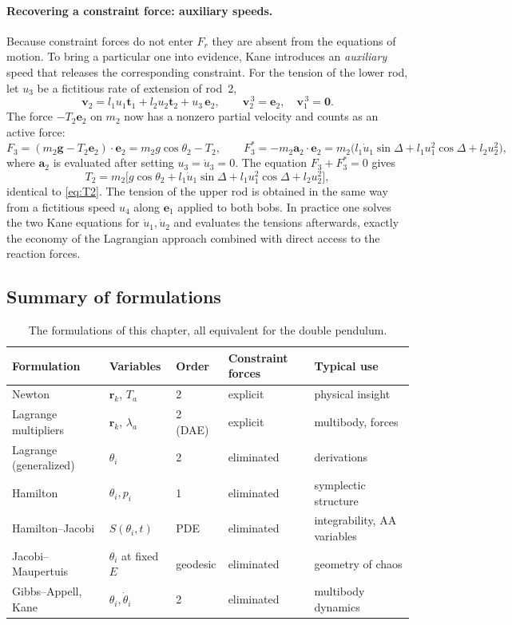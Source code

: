 \documentclass[11pt,a4paper]{book}
\theoremstyle{definition}
\theoremstyle{remark}
\begin{document}
\paragraph{Recovering a constraint force: auxiliary speeds.} Because constraint forces do not enter $F_r$ they are
absent from the equations of motion. To bring a particular one into evidence, Kane introduces an
\emph{auxiliary} speed that releases the corresponding constraint. For the tension of the lower rod, let $u_3$ be a
fictitious rate of extension of rod~2,
\[
  \bm v_2=l_1u_1\bm t_1+l_2u_2\bm t_2+u_3\,\bm e_2,\qquad \bm v_2^{\,3}=\bm e_2,\quad\bm v_1^{\,3}=\bm 0 .
\]
The force $-T_2\bm e_2$ on $m_2$ now has a nonzero partial velocity and counts as an active force:
\[
  F_3=(m_2\bm g-T_2\bm e_2)\cdot\bm e_2=m_2g\cos\theta_2-T_2,\qquad
  F_3^*=-m_2\bm a_2\!\cdot\!\bm e_2=m_2\big(l_1\dot u_1\sin\Delta+l_1u_1^2\cos\Delta+l_2u_2^2\big),
\]
where $\bm a_2$ is evaluated after setting $u_3=\dot u_3=0$. The equation $F_3+F_3^*=0$ gives
\[
  T_2=m_2\big[g\cos\theta_2+l_1\dot u_1\sin\Delta+l_1u_1^2\cos\Delta+l_2u_2^2\big],
\]
identical to \eqref{eq:T2}. The tension of the upper rod is obtained in the same way from a fictitious speed
$u_4$ along $\bm e_1$ applied to both bobs. In practice one solves the two Kane equations for $\dot u_1,\dot u_2$ and
evaluates the tensions afterwards, exactly the economy of the Lagrangian approach combined with direct access to
the reaction forces.

\subsection{Summary of formulations}

\begin{table}[ht]
\centering
\begin{tabular}{@{}lllll@{}}
\toprule
Formulation & Variables & Order & Constraint forces & Typical use\\
\midrule
Newton & $\bm r_k$, $T_a$ & 2 & explicit & physical insight\\
Lagrange multipliers & $\bm r_k$, $\lambda_a$ & 2 (DAE) & explicit & multibody, forces\\
Lagrange (generalized) & $\theta_i$ & 2 & eliminated & derivations\\
Hamilton & $\theta_i,p_i$ & 1 & eliminated & symplectic structure\\
Hamilton--Jacobi & $S(\theta_i,t)$ & PDE & eliminated & integrability, AA variables\\
Jacobi--Maupertuis & $\theta_i$ at fixed $E$ & geodesic & eliminated & geometry of chaos\\
Gibbs--Appell, Kane & $\theta_i,\dot\theta_i$ & 2 & eliminated & multibody dynamics\\
\bottomrule
\end{tabular}
\caption{The formulations of this chapter, all equivalent for the double pendulum.}
\end{table}
\end{document}
